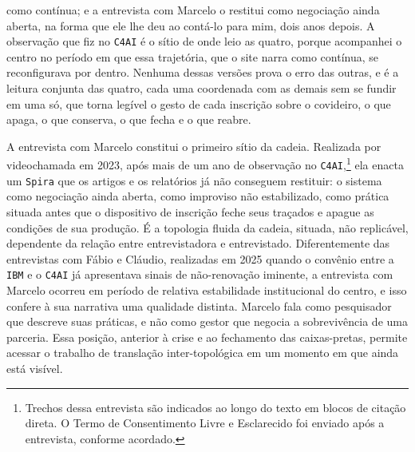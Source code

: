 como contínua; e a entrevista com Marcelo o restitui como negociação ainda aberta, na forma que ele lhe deu ao contá-lo para mim, dois anos depois. A observação que fiz no \texttt{C4AI} é o sítio de onde leio as quatro, porque acompanhei o centro no período em que essa trajetória, que o site narra como contínua, se reconfigurava por dentro. Nenhuma dessas versões prova o erro das outras, e é a leitura conjunta das quatro, cada uma coordenada com as demais sem se fundir em uma só, que torna legível o gesto de cada inscrição sobre o covideiro, o que apaga, o que conserva, o que fecha e o que reabre.

A entrevista com Marcelo constitui o primeiro sítio da cadeia. Realizada por videochamada em 2023, após mais de um ano de observação no \texttt{C4AI},\footnote{Trechos dessa entrevista são indicados ao longo do texto em blocos de citação direta. O Termo de Consentimento Livre e Esclarecido foi enviado após a entrevista, conforme acordado.} ela enacta um \texttt{Spira} que os artigos e os relatórios já não conseguem restituir: o sistema como negociação ainda aberta, como improviso não estabilizado, como prática situada antes que o dispositivo de inscrição feche seus traçados e apague as condições de sua produção. É a topologia fluida da cadeia, situada, não replicável, dependente da relação entre entrevistadora e entrevistado. Diferentemente das entrevistas com Fábio e Cláudio, realizadas em 2025 quando o convênio entre a \texttt{IBM} e o \texttt{C4AI} já apresentava sinais de não-renovação iminente, a entrevista com Marcelo ocorreu em período de relativa estabilidade institucional do centro, e isso confere à sua narrativa uma qualidade distinta. Marcelo fala como pesquisador que descreve suas práticas, e não como gestor que negocia a sobrevivência de uma parceria. Essa posição, anterior à crise e ao fechamento das caixas-pretas, permite acessar o trabalho de translação inter-topológica em um momento em que ainda está visível.

